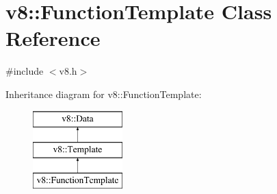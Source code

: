 \hypertarget{classv8_1_1FunctionTemplate}{\section{v8\-:\-:Function\-Template Class Reference}
\label{classv8_1_1FunctionTemplate}
}


{\ttfamily \#include $<$v8.\-h$>$}

Inheritance diagram for v8\-:\-:Function\-Template\-:\begin{figure}[H]
\begin{center}
\leavevmode
\includegraphics[height=3.000000cm]{classv8_1_1FunctionTemplate}
\end{center}
\end{figure}
